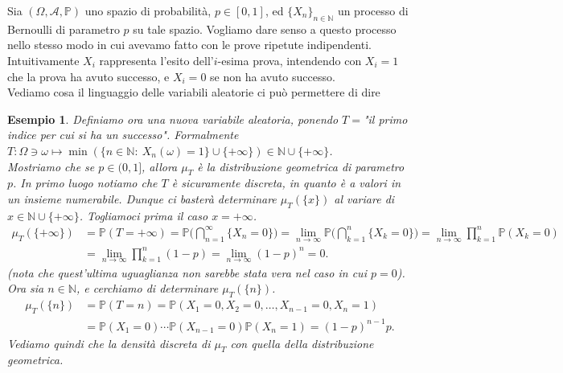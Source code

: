 \documentclass[11pt]{book}
\theoremstyle{Definizione}
\theoremstyle{TeoremaProposizioneLemmaCorollario}
\theoremstyle{OsservazioneNota}
\newtheorem{myes}{Esempio}[section]
\newcommand{\N}{\mathbb{N}}
\renewcommand{\P}{\mathbb{P}}
\begin{document}
\noindent
Sia $(\Omega,\mathcal{A},\P)$ uno spazio di probabilità, $p\in [0,1]$, ed $\{X_n\}_{n\in \N}$ un processo di Bernoulli di parametro $p$ su tale spazio. Vogliamo dare senso a questo processo nello stesso modo in cui avevamo fatto con le prove ripetute indipendenti.\\
Intuitivamente $X_i$ rappresenta l'esito dell'$i$-esima prova, intendendo con $X_i = 1$ che la prova ha avuto successo, e $X_i = 0$ se non ha avuto successo.\\
Vediamo cosa il linguaggio delle variabili aleatorie ci può permettere di dire
\begin{myes}
Definiamo ora una nuova variabile aleatoria, ponendo $T = $"il primo indice per cui si ha un successo". Formalmente $T :\Omega\ni \omega \longmapsto \min(\{n\in \N:\ X_n(\omega) = 1\}\cup \{+\infty\})\in \N\cup \{+\infty\}$.\\
Mostriamo che se $p\in (0,1]$, allora $\mu_T$ è la distribuzione geometrica di parametro $p$.
In primo luogo notiamo che $T$ è sicuramente discreta, in quanto è a valori in un insieme numerabile. Dunque ci basterà determinare $\mu_T(\{x\})$ al variare di $x\in \N \cup \{+\infty\}$. Togliamoci prima il caso $x = +\infty$.
\begin{align*}
\mu_T(\{+\infty\}) &= \P(T = +\infty) = \P\Bigg(\bigcap_{n = 1}^\infty \{X_n = 0\}\Bigg) = \lim_{n \to \infty} \P\Bigg(\bigcap_{k = 1}^n \{X_k = 0\}\Bigg) = \lim_{n \to \infty} \prod_{k = 1}^n \P(X_k = 0)\\
&= \lim_{n \to \infty} \prod_{k = 1}^n (1-p) = \lim_{n \to \infty} (1-p)^n = 0.
\end{align*}
(nota che quest'ultima uguaglianza non sarebbe stata vera nel caso in cui $p = 0$). Ora sia $n\in \N$, e cerchiamo di determinare $\mu_T(\{n\})$.
\begin{align*}
\mu_T(\{n\}) &= \P(T = n) = \P(X_1 = 0,X_2 = 0,\dots,X_{n-1} = 0,X_n = 1) \\
&= \P(X_1 = 0)\cdots\P(X_{n-1} = 0) \P(X_n = 1) = (1-p)^{n-1}p.
\end{align*}
Vediamo quindi che la densità discreta di $\mu_T$ con quella della distribuzione geometrica.
\end{myes}
\end{document}
